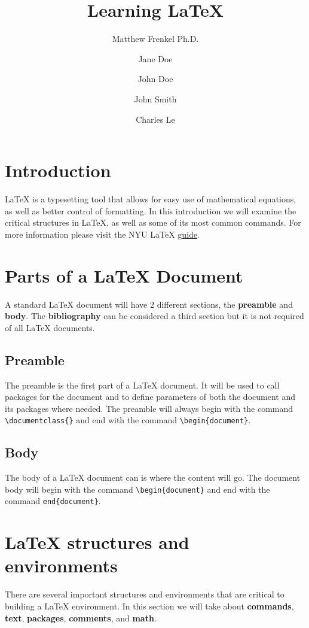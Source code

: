 \documentclass{article} 	%
\title{Learning \LaTeX}
\author[1,2]{Matthew Frenkel Ph.D.}
\author[1]{Jane Doe}
\author[1]{John Doe}
\author[2,*]{John Smith}
\author[3]{Charles Le}
\affil[1]{NYU}
\affil[2]{Rutgers}
\affil[*]{ASCE}
\affil[3]{HUST}
\numberwithin{equation}{section}
\begin{document}
	\maketitle
	\newpage
	\tableofcontents
	\newpage
	
	\section{Introduction}
	\LaTeX{} is a typesetting tool that allows for easy use of mathematical equations, as well as better control of formatting.  In this introduction we will examine the critical structures in \LaTeX{}, as well as some of its most common commands.  For more information please visit the NYU \LaTeX{} \href{http://guides.nyu.edu/LaTeX}{guide}. %
	
	
	
	\section{Parts of a LaTeX Document} %
	A standard \LaTeX{} document will have 2 different sections, the \textbf{preamble} and \textbf{body}.  The \textbf{bibliography} can be considered a third section but it is not required of all \LaTeX{} documents.
	    
		\subsection{Preamble}   %
	The preamble is the first part of a \LaTeX{} document.  It will be used to call packages for the document and to define parameters of both the document and its packages where needed.  The preamble will always begin with the command \verb|\documentclass{}| and end with the command \verb|\begin{document}|.
	
		\subsection{Body}
	The body of a \LaTeX{} document can is where the content will go.  The document body will begin with the command \verb|\begin{document}| and end with the command \verb|end{document}|.
	
	\section{\LaTeX{} structures and environments}
	There are several important structures and environments that are critical to building a \LaTeX{} environment.  In this section we will take about \textbf{commands}, \textbf{text}, \textbf{packages}, \textbf{comments}, and \textbf{math}.
	
\end{document}
